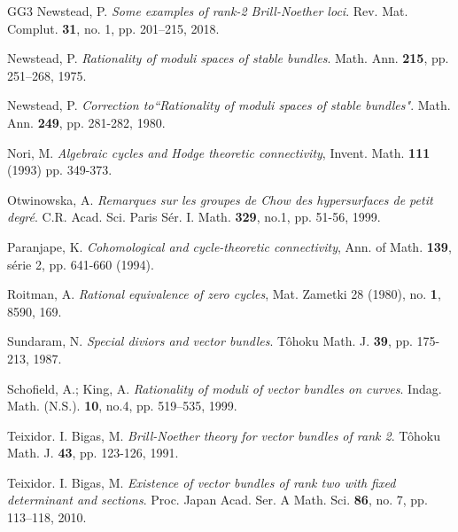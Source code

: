 \documentclass[12pt, reqno]{amsart}
\begin{document}
\begin{thebibliography}{GG3}
 Newstead, P. {\it Some examples of rank-2 Brill-Noether loci}. Rev. Mat. Complut. {\bf 31}, no. 1, pp. 201–215, 2018.

 Newstead, P. {\it Rationality of moduli spaces of stable bundles}. Math. Ann. {\bf 215}, pp. 251–268, 1975.

 Newstead, P. {\it Correction to``Rationality of moduli spaces of stable bundles"}. Math. Ann. {\bf 249}, pp. 281-282, 1980.

 Nori, M. {\it  Algebraic cycles and Hodge theoretic connectivity}, Invent.
 Math. \textbf{111} (1993) pp. 349-373. 

 Otwinowska, A. {\it Remarques sur les groupes de Chow des hypersurfaces de petit degr\'e}. C.R. Acad. Sci. Paris S\'er. I. Math. {\bf 329}, no.1, pp. 51-56, 1999.

 Paranjape, K. {\it  Cohomological and cycle-theoretic connectivity}, Ann. of Math. \textbf{139}, s\'erie 2,
 pp. 641-660 (1994). 

 Roitman, A. {\it Rational equivalence of zero cycles}, Mat. Zametki 28 (1980), no.\textbf{ 1}, 8590, 169. 

 Sundaram, N. {\it Special diviors and vector bundles}. T\^ohoku Math. J. {\bf 39}, pp. 175-213, 1987.

 Schofield, A.; King, A. {\it Rationality of moduli of vector bundles on
curves}. Indag. Math. (N.S.). {\bf 10}, no.4, pp. 519–535, 1999.

 Teixidor. I. Bigas, M. {\it Brill-Noether theory for vector bundles of rank 2}. T\^ohoku Math. J. {\bf 43}, pp. 123-126, 1991. 

 Teixidor. I. Bigas, M. {\it Existence of vector bundles of rank two with fixed determinant and sections}. Proc. Japan Acad. Ser. A Math. Sci. {\bf 86}, no. 7, pp. 113–118, 2010.

\end{thebibliography}
\end{document}
